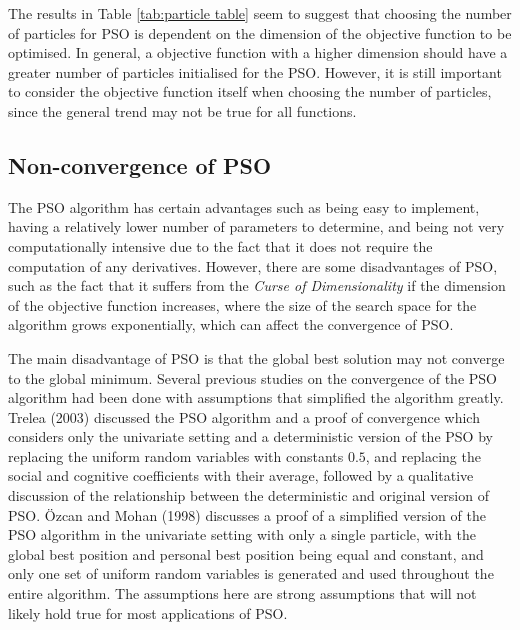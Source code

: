 \documentclass[12pt]{article}
\theoremstyle{definition}
\begin{document}
The results in Table \ref{tab:particle table} seem to suggest that choosing the number of particles for PSO is dependent on the dimension of the objective function to be optimised. In general, a objective function with a higher dimension should have a greater number of particles initialised for the PSO. However, it is still important to consider the objective function itself when choosing the number of particles, since the general trend may not be true for all functions.

\subsection{Non-convergence of PSO}
\label{subsection:pso non-convergence}
The PSO algorithm has certain advantages such as being easy to implement, having a relatively lower number of parameters to determine, and being not very computationally intensive due to the fact that it does not require the computation of any derivatives. However, there are some disadvantages of PSO, such as the fact that it suffers from the \textit{Curse of Dimensionality} \cite{Bellman:1957, chen2015} if the dimension of the objective function increases, where the size of the search space for the algorithm grows exponentially, which can affect the convergence of PSO. \newline

The main disadvantage of PSO is that the global best solution may not converge to the global minimum. Several previous studies on the convergence of the PSO algorithm had been done with assumptions that simplified the algorithm greatly. Trelea (2003) \cite{TRELEA2003317} discussed the PSO algorithm and a proof of convergence which considers only the univariate setting and a deterministic version of the PSO by replacing the uniform random variables with constants $0.5$, and replacing the social and cognitive coefficients with their average, followed by a qualitative discussion of the relationship between the deterministic and original version of PSO.  {\"O}zcan and Mohan (1998) \cite{ozcan1998analysis} discusses a proof of a simplified version of the PSO algorithm in the univariate setting with only a single particle, with the global best position and personal best position being equal and constant, and only one set of uniform random variables is generated and used throughout the entire algorithm. The assumptions here are strong assumptions that will not likely hold true for most applications of PSO. \newline
\end{document}
